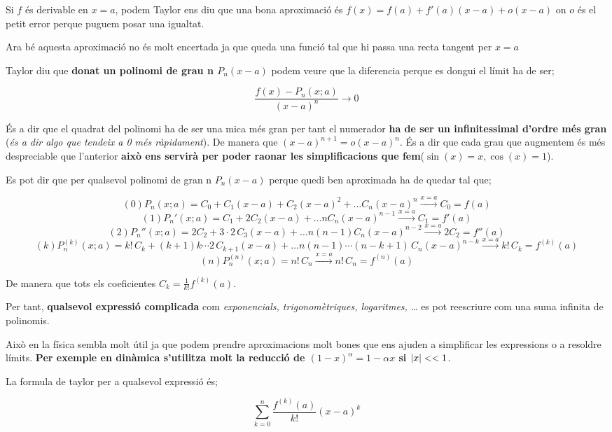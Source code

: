 \documentclass[12pt]{article}
\begin{document}
Si $f$ és derivable en $x=a$, podem Taylor ens diu que una bona aproximació és $f(x) = f(a) + f'(a)(x-a) + o(x-a)$ on $o$ és el petit error perque puguem posar una igualtat.

Ara bé aquesta aproximació no és molt encertada ja que queda una funció tal que hi passa una recta tangent per $x=a$

Taylor diu que \textbf{donat un polinomi de grau n $P_n(x-a)$} podem veure que la diferencia perque es dongui el límit ha de ser;

\[\frac{f(x) - P_n(x;a)}{(x-a)^n} \rightarrow 0 \]

És a dir que el quadrat del polinomi ha de ser una mica més gran per tant el numerador \textbf{ha de ser un infinitessimal d'ordre més gran} (\textit{és a dir algo que tendeix a 0 més ràpidament}). De manera que $(x-a)^{n+1} = o (x-a)^n$. És a dir que cada grau que augmentem és més despreciable que l'anterior \textbf{això ens servirà per poder raonar les simplificacions que fem}($\sin(x) = x, \cos(x) = 1$).

Es pot dir que per qualsevol polinomi de gran n $P_n(x-a)$ perque quedi ben aproximada ha de quedar tal que;

\[(0) P_n(x; a) = C_0 + C_1(x-a) + C_2 (x-a)^2 + \dots C_n(x-a)^n \xrightarrow{x=a} C_0 = f(a)\]
\[(1) P_n'(x; a) = C_1 + 2C_2 (x-a) + \dots nC_n(x-a)^{n-1} \xrightarrow{x=a} C_1 = f'(a)\]
\[(2) P_n''(x; a) = 2C_2 + 3\cdot 2\,C_3(x-a) + \dots n(n-1)C_n(x-a)^{n-2} \xrightarrow{x=a} 2C_2 = f''(a)\]
\[(k) P_n^{(k)}(x; a) = k!\,C_k + (k+1)k\cdots 2\,C_{k+1}(x-a) + \dots n(n-1)\cdots(n-k+1)\,C_n(x-a)^{n-k} \xrightarrow{x=a} k!\,C_k = f^{(k)}(a)\]
\[(n) P_n^{(n)}(x; a) = n!\,C_n \xrightarrow{x=a} n!\,C_n = f^{(n)}(a)\]

De manera que tots els coeficientes $C_k = \frac{1}{k!}f^(k)(a)$. 

Per tant, \textbf{qualsevol expressió complicada} com \textit{exponencials, trigonomètriques, logaritmes, \dots} es pot reescriure com una suma infinita de polinomis.

Això en la física sembla molt útil ja que podem prendre aproximacions molt bones que ens ajuden a simplificar les expressions o a resoldre límits. \textbf{Per exemple en dinàmica s'utilitza molt la reducció de $(1-x)^{\alpha} = 1-\alpha x$ si $\abs{x} << 1$}. 

La formula de taylor per a qualsevol expressió és;

\[\boxed{\sum_{k=0}^{n} \frac{f^{(k)}(a)}{k!}(x-a)^k}\]
\end{document}
